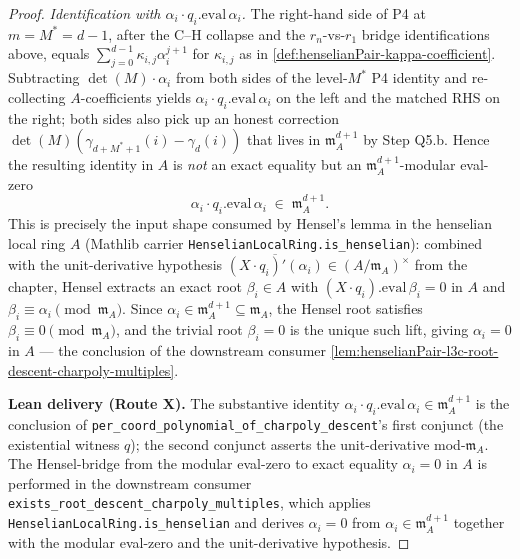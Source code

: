 \begin{proof}
\emph{Identification with $\alpha_i \cdot q_i.\mathrm{eval}\,
\alpha_i$.} The right-hand side of P4 at $m = M^* = d - 1$,
after the C--H collapse and the $r_n$-vs-$r_1$ bridge
identifications above, equals $\sum_{j = 0}^{d - 1}
\kappa_{i,j} \alpha_i^{j+1}$ for $\kappa_{i,j}$ as in
\cref{def:henselianPair-kappa-coefficient}. Subtracting
$\det(M) \cdot \alpha_i$ from both sides of the level-$M^*$
P4 identity and re-collecting $A$-coefficients yields
$\alpha_i \cdot q_i.\mathrm{eval}\,\alpha_i$ on the left and
the matched RHS on the right; both sides also pick up an
honest correction
$\det(M)(\gamma_{d+M^*+1}(i) - \gamma_d(i))$ that lives in
$\mathfrak m_A^{d+1}$ by Step Q5.b. Hence the resulting identity
in $A$ is \emph{not} an exact equality but an
$\mathfrak m_A^{d+1}$-modular eval-zero
\[
\alpha_i \cdot q_i.\mathrm{eval}\,\alpha_i \;\in\;
\mathfrak m_A^{d+1}.
\]
This is precisely the input shape consumed by Hensel's lemma in
the henselian local ring $A$ (Mathlib carrier
\texttt{HenselianLocalRing.is\_henselian}): combined with the
unit-derivative hypothesis
$\overline{(X \cdot q_i)'(\alpha_i)} \in (A / \mathfrak m_A)^\times$
from the chapter, Hensel extracts an exact root $\beta_i \in A$
with $(X \cdot q_i).\mathrm{eval}\,\beta_i = 0$ in $A$ and
$\beta_i \equiv \alpha_i \pmod{\mathfrak m_A}$. Since
$\alpha_i \in \mathfrak m_A^{d+1} \subseteq \mathfrak m_A$, the
Hensel root satisfies $\beta_i \equiv 0 \pmod{\mathfrak m_A}$,
and the trivial root $\beta_i = 0$ is the unique such lift,
giving $\alpha_i = 0$ in $A$ --- the conclusion of the
downstream consumer
\cref{lem:henselianPair-l3c-root-descent-charpoly-multiples}.

\textbf{Lean delivery (Route X).} The substantive identity
$\alpha_i \cdot q_i.\mathrm{eval}\,\alpha_i \in \mathfrak m_A^{d+1}$
is the conclusion of
\texttt{per\_coord\_polynomial\_of\_charpoly\_descent}'s first
conjunct (the existential witness $q$); the second conjunct
asserts the unit-derivative mod-$\mathfrak m_A$. The
Hensel-bridge from the modular eval-zero to exact equality
$\alpha_i = 0$ in $A$ is performed in the downstream consumer
\texttt{exists\_root\_descent\_charpoly\_multiples}, which
applies \texttt{HenselianLocalRing.is\_henselian} and derives
$\alpha_i = 0$ from $\alpha_i \in \mathfrak m_A^{d+1}$ together
with the modular eval-zero and the unit-derivative hypothesis.


\end{proof}
